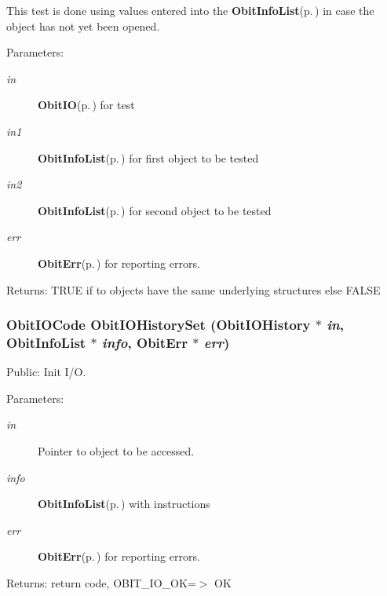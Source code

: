 This test is done using values entered into the {\bf Obit\-Info\-List}{\rm (p.\,\pageref{structObitInfoList})} in case the object has not yet been opened. \begin{Desc}
\item[Parameters:]
\begin{description}
\item[{\em in}]{\bf Obit\-IO}{\rm (p.\,\pageref{structObitIO})} for test \item[{\em in1}]{\bf Obit\-Info\-List}{\rm (p.\,\pageref{structObitInfoList})} for first object to be tested \item[{\em in2}]{\bf Obit\-Info\-List}{\rm (p.\,\pageref{structObitInfoList})} for second object to be tested \item[{\em err}]{\bf Obit\-Err}{\rm (p.\,\pageref{structObitErr})} for reporting errors. \end{description}
\end{Desc}
\begin{Desc}
\item[Returns:]TRUE if to objects have the same underlying structures else FALSE \end{Desc}
\subsubsection{\setlength{\rightskip}{0pt plus 5cm}Obit\-IOCode Obit\-IOHistory\-Set ({\bf Obit\-IOHistory} $\ast$ {\em in}, {\bf Obit\-Info\-List} $\ast$ {\em info}, {\bf Obit\-Err} $\ast$ {\em err})}\label{ObitIOHistory_8h_a14}


Public: Init I/O. 

\begin{Desc}
\item[Parameters:]
\begin{description}
\item[{\em in}]Pointer to object to be accessed. \item[{\em info}]{\bf Obit\-Info\-List}{\rm (p.\,\pageref{structObitInfoList})} with instructions \item[{\em err}]{\bf Obit\-Err}{\rm (p.\,\pageref{structObitErr})} for reporting errors. \end{description}
\end{Desc}
\begin{Desc}
\item[Returns:]return code, OBIT\_\-IO\_\-OK=$>$ OK \end{Desc}
